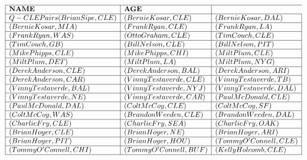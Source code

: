 \documentclass{ximera}
\begin{document}
\begin{center}
\[
\begin{array}{|l|l|l|}
\hline
\textbf{NAME} & \textbf{AGE} \\\hline
Q-CLE Pairs
(Brian Sipe, CLE) &  (Bernie Kosar, CLE) & (Bernie Kosar, DAL) \\\hline 


(Bernie Kosar, MIA) & (Frank Ryan, CLE) & (Frank Ryan, LA) \\\hline 


(Frank Ryan, WAS) & (Otto Graham, CLE) & (Tim Couch, CLE) \\\hline 


(Tim Couch, GB) & (Bill Nelson, CLE) & (Bill Nelson, PIT) \\\hline


(Mike Phipps, CLE) & (Mike Phipps, CHI) & (Milt Plum, CLE) \\\hline


(Milt Plum, DET) & (Milt Plum, LA) & (Milt Plum, NYG) \\\hline


(Derek Anderson, CLE) & (Derek Anderson, BAL) & (Derek Anderson, ARI) \\\hline


(Derek Anderson, CAR) & (Vinny Testaverde, CLE) & (Vinny Testaverde, TB) \\\hline


(Vinny Testaverde, BAL) & (Vinny Testaverde, NYJ) & (Vinny Testaverde, DAL) \\\hline 


(Vinny Testaverde, NE) & (Vinny Testaverde, CAR) & (Paul McDonald, CLE) \\\hline 


(Paul McDonald, DAL) & (Colt McCoy, CLE) & (Colt McCoy, SF) \\\hline 


(Colt McCoy, WAS) & (Brandon Weeden, CLE) & (Brandon Weeden, DAL) \\\hline 


(Charlie Fry, CLE) & (Charlie Fry, SEA) & (Charlie Fry, OAK) \\\hline 


(Brian Hoyer, CLE) & (Brian Hoyer, NE) & (Brian Hoyer, ARI) \\\hline 


(Brian Hoyer, PIT) & (Brian Hoyer, HOU) & (Tommy O'Connell, CLE) \\\hline 


(Tommy O'Connell, CHI) & (Tommy O'Connell, BUF) & (Kelly Holcomb, CLE) \\\hline 



\end{array}\]
\end{center}
\end{document}
